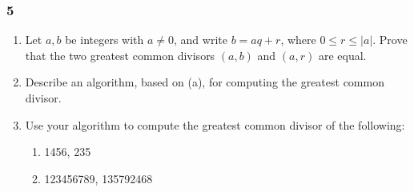 \documentclass[11pt]{article}
\theoremstyle{definition}
\begin{document}
        \subsubsection{5}
        \begin{enumerate}[label=\textbf{(\alph*)}]
            \item Let $a,b$ be integers with $a\neq 0$, and write $b=aq+r$, where $0\leq r\leq |a|$. Prove that the two greatest common divisors $(a,b)$ and $(a,r)$ are equal.

            \item Describe an algorithm, based on (a), for computing the greatest common divisor.

            \item Use your algorithm to compute the greatest common divisor of the following:
            \begin{enumerate}[label=(\alph*)]
                \item 1456, 235

                \item 123456789, 135792468
            \end{enumerate}
        \end{enumerate}
\end{document}
